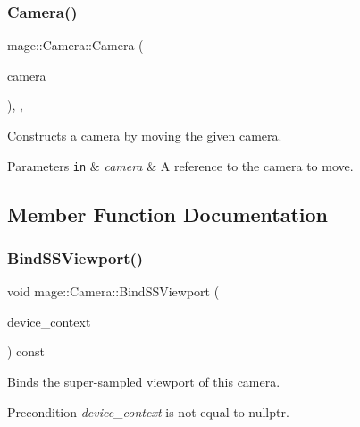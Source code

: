 \subsubsection{\texorpdfstring{Camera()}{Camera()}\hspace{0.1cm}{\footnotesize\ttfamily [3/3]}}
{\footnotesize\ttfamily mage\+::\+Camera\+::\+Camera (\begin{DoxyParamCaption}\item[{\hyperlink{classmage_1_1_camera}{Camera} \&\&}]{camera }\end{DoxyParamCaption})\hspace{0.3cm}{\ttfamily [protected]}, {\ttfamily [default]}, {\ttfamily [noexcept]}}

Constructs a camera by moving the given camera.


\begin{DoxyParams}[1]{Parameters}
\mbox{\tt in}  & {\em camera} & A reference to the camera to move. \\
\hline
\end{DoxyParams}


\subsection{Member Function Documentation}
\hypertarget{classmage_1_1_camera_a4e961fccd81e9d6ed160f59e2b8fbc3c}{}\label{classmage_1_1_camera_a4e961fccd81e9d6ed160f59e2b8fbc3c} 
\subsubsection{\texorpdfstring{Bind\+S\+S\+Viewport()}{BindSSViewport()}}
{\footnotesize\ttfamily void mage\+::\+Camera\+::\+Bind\+S\+S\+Viewport (\begin{DoxyParamCaption}\item[{I\+D3\+D11\+Device\+Context4 $\ast$}]{device\+\_\+context }\end{DoxyParamCaption}) const\hspace{0.3cm}{\ttfamily [noexcept]}}

Binds the super-\/sampled viewport of this camera.

\begin{DoxyPrecond}{Precondition}
{\itshape device\+\_\+context} is not equal to {\ttfamily nullptr}. 
\end{DoxyPrecond}

